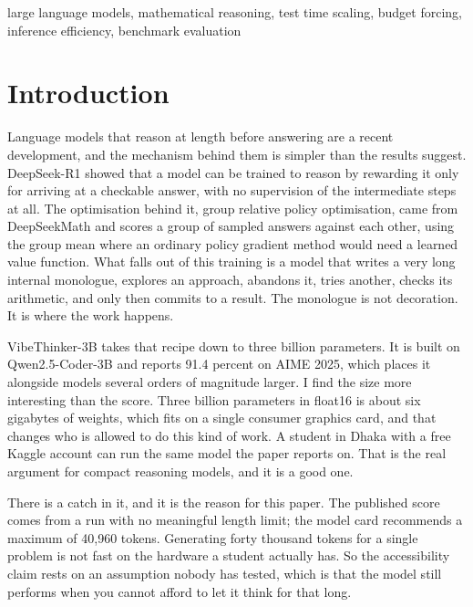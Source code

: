 \documentclass[conference]{IEEEtran}
\begin{document}
\begin{IEEEkeywords}
large language models, mathematical reasoning, test time scaling, budget forcing,
inference efficiency, benchmark evaluation
\end{IEEEkeywords}

\section{Introduction}

Language models that reason at length before answering are a recent development,
and the mechanism behind them is simpler than the results suggest. DeepSeek-R1
\cite{deepseekr1} showed that a model can be trained to reason by rewarding it
only for arriving at a checkable answer, with no supervision of the intermediate
steps at all. The optimisation behind it, group relative policy optimisation,
came from DeepSeekMath \cite{deepseekmath} and scores a group of sampled
answers against each other, using the group mean where an ordinary policy
gradient method would need a learned value function. What
falls out of this training is a model that writes a very long internal monologue,
explores an approach, abandons it, tries another, checks its arithmetic, and only
then commits to a result. The monologue is not decoration. It is where the work
happens.

VibeThinker-3B \cite{vibethinker} takes that recipe down to three billion
parameters. It is built on Qwen2.5-Coder-3B \cite{qwen25coder} and reports 91.4
percent on AIME 2025, which places it alongside models several orders of
magnitude larger. I find the size more interesting than the score. Three billion
parameters in float16 is about six gigabytes of weights, which fits on a single
consumer graphics card, and that changes who is allowed to do this kind of work.
A student in Dhaka with a free Kaggle account can run the same model the paper
reports on. That is the real argument for compact reasoning models, and it is a
good one.

There is a catch in it, and it is the reason for this paper. The published score
comes from a run with no meaningful length limit; the model card recommends a
maximum of 40,960 tokens. Generating forty thousand tokens for a single problem
is not fast on the hardware a student actually has. So the accessibility claim
rests on an assumption nobody has tested, which is that the model still performs
when you cannot afford to let it think for that long.
\end{document}
